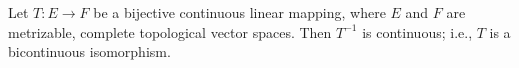 Let $T: E \to F$ be a bijective continuous linear mapping, where $E$ and $F$ are metrizable, complete topological vector spaces. Then $T^{-1}$ is continuous; i.e., $T$ is a bicontinuous isomorphism.
